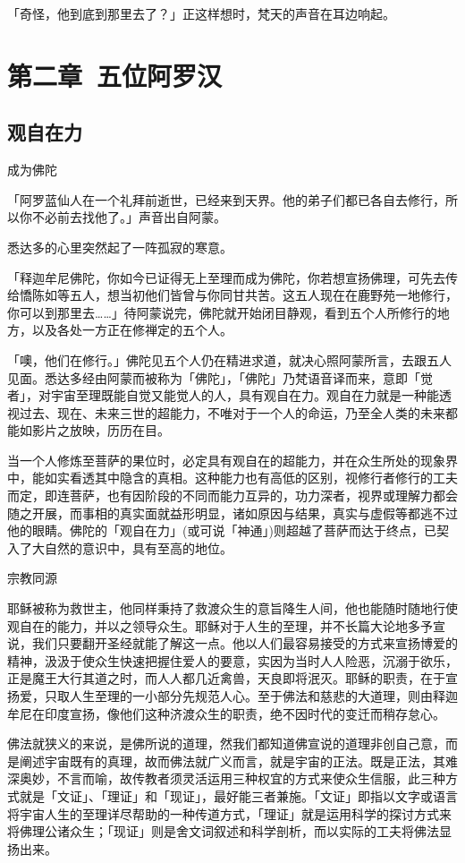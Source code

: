 \documentclass[12pt,twoside,openany]{book}
\begin{document}
「奇怪，他到底到那里去了？」正这样想时，梵天的声音在耳边响起。

\chapter{第二章\ 五位阿罗汉}\label{ch2}

\section{观自在力}\label{sec2.1}
成为佛陀

「阿罗蓝仙人在一个礼拜前逝世，已经来到天界。他的弟子们都已各自去修行，所以你不必前去找他了。」声音出自阿蒙。

悉达多的心里突然起了一阵孤寂的寒意。

「释迦牟尼佛陀，你如今已证得无上至理而成为佛陀，你若想宣扬佛理，可先去传给憍陈如等五人，想当初他们皆曾与你同甘共苦。这五人现在在鹿野苑一地修行，你可以到那里去……」待阿蒙说完，佛陀就开始闭目静观，看到五个人所修行的地方，以及各处一方正在修禅定的五个人。

「噢，他们在修行。」佛陀见五个人仍在精进求道，就决心照阿蒙所言，去跟五人见面。悉达多经由阿蒙而被称为「佛陀」，「佛陀」乃梵语音译而来，意即「觉者」，对宇宙至理既能自觉又能觉人的人，具有观自在力。观自在力就是一种能透视过去、现在、未来三世的超能力，不唯对于一个人的命运，乃至全人类的未来都能如影片之放映，历历在目。

当一个人修炼至菩萨的果位时，必定具有观自在的超能力，并在众生所处的现象界中，能如实看透其中隐含的真相。这种能力也有高低的区别，视修行者修行的工夫而定，即连菩萨，也有因阶段的不同而能力互异的，功力深者，视界或理解力都会随之开展，而事相的真实面就益形明显，诸如原因与结果，真实与虚假等都逃不过他的眼睛。佛陀的「观自在力」(或可说「神通」)则超越了菩萨而达于终点，已契入了大自然的意识中，具有至高的地位。

宗教同源

耶稣被称为救世主，他同样秉持了救渡众生的意旨降生人间，他也能随时随地行使观自在的能力，并以之领导众生。耶稣对于人生的至理，并不长篇大论地多予宣说，我们只要翻开圣经就能了解这一点。他以人们最容易接受的方式来宣扬博爱的精神，汲汲于使众生快速把握住爱人的要意，实因为当时人人险恶，沉溺于欲乐，正是魔王大行其道之时，而人人都几近禽兽，天良即将泯灭。耶稣的职责，在于宣扬爱，只取人生至理的一小部分先规范人心。至于佛法和慈悲的大道理，则由释迦牟尼在印度宣扬，像他们这种济渡众生的职责，绝不因时代的变迁而稍存怠心。

佛法就狭义的来说，是佛所说的道理，然我们都知道佛宣说的道理非创自己意，而是阐述宇宙既有的真理，故而佛法就广义而言，就是宇宙的正法。既是正法，其难深奥妙，不言而喻，故传教者须灵活运用三种权宜的方式来使众生信服，此三种方式就是「文证」、「理证」和「现证」，最好能三者兼施。「文证」即指以文字或语言将宇宙人生的至理详尽帮助的一种传道方式，「理证」就是运用科学的探讨方式来将佛理公诸众生；「现证」则是舍文词叙述和科学剖析，而以实际的工夫将佛法显扬出来。
\end{document}
